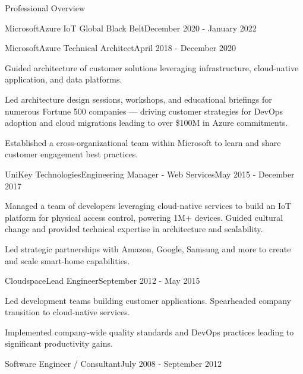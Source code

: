\documentclass{resume} %
\begin{document}
\begin{rSection}{Professional Overview}
\begin{rNewRole}{Microsoft}{Azure IoT Global Black Belt}{December 2020 - January 2022}
  \end{rNewRole}

  \begin{rNewRole}{Microsoft}{Azure Technical Architect}{April 2018 - December 2020}
      
    \item Guided architecture of customer solutions leveraging infrastructure, cloud-native application, and data platforms.
    \item Led architecture design sessions, workshops, and educational briefings for numerous Fortune 500 companies --- driving customer strategies for DevOps adoption and cloud migrations leading to over \$100M in Azure commitments.
    \item Established a cross-organizational team within Microsoft to learn and share customer engagement best practices.
    
  \end{rNewRole}
  
  
  \begin{rNewRole}{UniKey Technologies}{Engineering Manager - Web Services}{May 2015 - December 2017}
    
    \item Managed a team of developers leveraging cloud-native services to build an IoT platform for physical access control, powering 1M+ devices.  Guided cultural change and provided technical expertise in architecture and scalability.
    \item Led strategic partnerships with Amazon, Google, Samsung and more to create and scale smart-home capabilities.
    
  \end{rNewRole}
  
  
  \begin{rNewRole}{Cloudspace}{Lead Engineer}{September 2012 - May 2015}
    
    \item Led development teams building customer applications. Spearheaded company transition to cloud-native services.
    \item Implemented company-wide quality standards and DevOps practices leading to significant productivity gains.
    
  \end{rNewRole}
  
  
  \begin{rCompany}{Software Engineer / Consultant}{July 2008 - September 2012}{}

  \end{rCompany}
  
  
  
\end{rSection}
\end{document}
